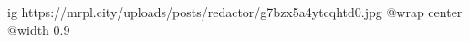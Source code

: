  
 
 
 
 

\ifcmt
  ig https://mrpl.city/uploads/posts/redactor/g7bzx5a4ytcqhtd0.jpg
  @wrap center
  @width 0.9
\fi

